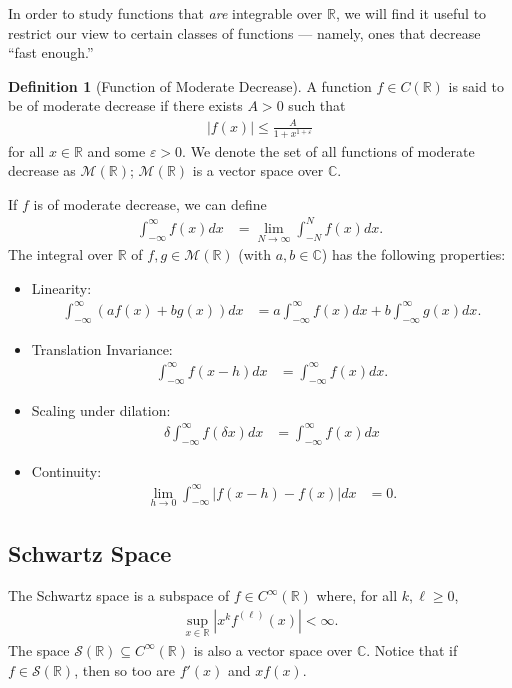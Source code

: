 \documentclass[10pt]{extarticle}
\newcommand{\R}{\mathbb{R}}
\newcommand{\C}{\mathbb{C}}
\theoremstyle{plain}
\theoremstyle{definition}
\newtheorem*{definition}{Definition}
\theoremstyle{remark}
\renewcommand{\newline}{\hfill\break}
\begin{document}
  In order to study functions that \textit{are} integrable over $\R$, we will find it useful to restrict our view to certain classes of functions --- namely, ones that decrease ``fast enough.''
  \begin{definition}[Function of Moderate Decrease]
    A function $f\in C(\R)$ is said to be of moderate decrease if there exists $A > 0$ such that
    \begin{align*}
      |f(x)| \leq \frac{A}{1 + x^{1 + \varepsilon}}
    \end{align*}
    for all $x\in \R$ and some $\varepsilon > 0$. We denote the set of all functions of moderate decrease as $\mathcal{M}(\R)$; $\mathcal{M}(\R)$ is a vector space over $\C$.
  \end{definition}
  If $f$ is of moderate decrease, we can define
  \begin{align*}
    \int_{-\infty}^{\infty}f(x)dx &= \lim_{N\rightarrow\infty}\int_{-N}^{N}f(x)dx.
  \end{align*}
  The integral over $\R$ of $f,g\in \mathcal{M}(\R)$ (with $a,b\in \C$) has the following properties:
  \begin{itemize}
    \item Linearity:
      \begin{align*}
        \int_{-\infty}^{\infty}\left(af(x) + bg(x)\right) dx &= a\int_{-\infty}^{\infty}f(x)dx + b\int_{-\infty}^{\infty}g(x)dx.
      \end{align*}
    \item Translation Invariance:
      \begin{align*}
        \int_{-\infty}^{\infty}f(x-h)dx &= \int_{-\infty}^{\infty}f(x)dx.
      \end{align*}
    \item Scaling under dilation:
      \begin{align*}
        \delta\int_{-\infty}^{\infty}f(\delta x)dx &= \int_{-\infty}^{\infty}f(x)dx
      \end{align*}
    \item Continuity:
      \begin{align*}
        \lim_{h\rightarrow 0}\int_{-\infty}^{\infty}|f(x-h) - f(x)|dx &= 0.
      \end{align*}
  \end{itemize}
  \subsection{Schwartz Space}%
  The Schwartz space is a subspace of $f\in C^{\infty}(\R)$ where, for all $k,\ell \geq 0$,
  \begin{align*}
    \sup_{x\in \R}\left\vert x^{k}f^{(\ell)}(x) \right\vert < \infty.
  \end{align*}
  The space $\mathcal{S}(\R)\subseteq C^{\infty}(\R)$ is also a vector space over $\C$. Notice that if $f\in \mathcal{S}(\R)$, then so too are $f'(x)$ and $xf(x)$.\newline
\end{document}
